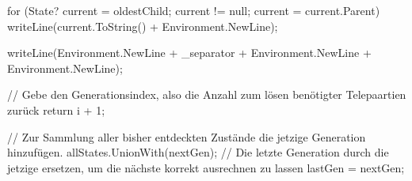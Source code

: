 \documentclass[a4paper,10pt,ngerman]{scrartcl}
\begin{document}
\begin{lstcs}
{{{{{{                        for (State? current = oldestChild; current != null; current = current.Parent)
                        {
                            writeLine(current.ToString() + Environment.NewLine);
                        }
                    }

                    writeLine(Environment.NewLine + _separator + Environment.NewLine + Environment.NewLine);
                }

                // Gebe den Generationsindex, also die Anzahl zum lösen benötigter Telepaartien zurück
                return i + 1;
            }

            // Zur Sammlung aller bisher entdeckten Zustände die jetzige Generation hinzufügen.
            allStates.UnionWith(nextGen);
            // Die letzte Generation durch die jetzige ersetzen, um die nächste korrekt ausrechnen zu lassen
            lastGen = nextGen;
        }
    }
}
\end{lstcs}
\end{document}
